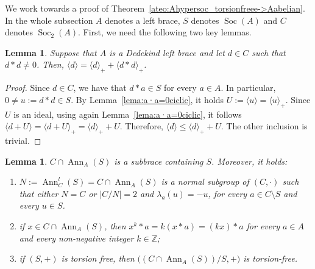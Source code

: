 \documentclass[12pt, a4paper, english]{article}
\newtheorem{lema}[teorema]{Lemma}
\theoremstyle{definition}
\DeclareMathOperator{\Ann}{Ann}
\DeclareMathOperator{\Soc}{Soc}
\begin{document}
\label{subsec:proof2}

We work towards a proof of Theorem~\ref{ateo:Ahypersoc_torsionfreee->Aabelian}. In the whole subsection $A$ denotes a left brace, $S$ denotes $\Soc(A)$ and $C$ denotes $\Soc_2(A)$. First, we need the following two key lemmas.

\begin{lema}
\label{lema:dastd-nozero+Dededkind-><d>=<d>+<dastd>}
Suppose that $A$ is a Dedekind left brace and let  $d \in C$ such that $d \ast d \neq 0$. Then, $\langle d \rangle = \langle d \rangle_+ + \langle d\ast d \rangle_+$.  %
\end{lema}

\begin{proof}
Since $d\in C$, we have that $d\ast a \in S$ for every $a\in A$. In particular, $0 \neq u := d\ast d \in S$. By Lemma~\ref{lema:a·a=0ciclic}, it holds $U:= \langle u \rangle = \langle u \rangle_+$. Since $U$ is an ideal, using again Lemma~\ref{lema:a·a=0ciclic}, it follows $\langle d+U\rangle = \langle d+ U\rangle_+ = \langle d \rangle_+ + U$. Therefore, $\langle d \rangle  \leq \langle d \rangle_+ + U$. The other inclusion is trivial.
\end{proof}

\begin{lema}
\label{lema:CcapAnn_torsionfree+kxasta+torsionfree}
$C \cap \Ann_A(S)$ is a subbrace containing $S$. Moreover, it holds:
\begin{enumerate}
\item $N:= \Ann_C^l(S) = C \cap \Ann_A(S)$ is a normal subgroup of $(C,\cdot)$ such that either $N = C$ or $|C/N| = 2$ and $\lambda_a(u) = -u$, for every $a \in C \setminus S$ and every $u \in S$.
\item if $x \in C\cap \Ann_A(S)$, then  $x^k\ast a = k(x \ast a) = (kx) \ast a$ for every $a \in A$ and every non-negative integer $k\in \mathbb{Z}$;
\item if $(S,+)$ is torsion free, then $\big((C\cap \Ann_A(S))/S, +\big)$ is torsion-free.
\end{enumerate}
\end{lema}
\end{document}

